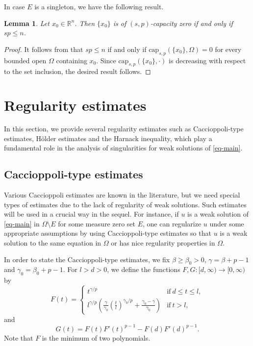 \documentclass[11pt]{amsart}
\theoremstyle{plain}
\newtheorem{lemma}[theorem]{Lemma}
\theoremstyle{definition}
\numberwithin{equation}{section}
\begin{document}
In case $E$ is a singleton, we have the following result.

\begin{lemma}\label{lem-cap-point}
	Let $x_0 \in \mathbb{R}^n$. Then $\{x_0\}$ is of $(s, p)$-capacity zero if and only if $sp \leq n$.
\end{lemma}

\begin{proof}
It follows from \cite[Lemma~5.5]{BBK24} that $sp\leq n$ if and only if $\mathrm{cap}_{s, p}(\{x_0\}, \Omega)=0$ for every bounded open $\Omega$ containing $x_0$. Since $\mathrm{cap}_{s, p}(\{x_0\}, \cdot)$ is decreasing with respect to the set inclusion, the desired result follows.
\end{proof}

\section{Regularity estimates}\label{sec-regularity}

In this section, we provide several regularity estimates such as Caccioppoli-type estimates, H\"older estimates and the Harnack inequality, which play a fundamental role in the analysis of singularities for weak solutions of \eqref{eq-main}.

\subsection{Caccioppoli-type estimates}

Various Caccioppoli estimates are known in the literature, but we need special types of estimates due to the lack of regularity of weak solutions. Such estimates will be used in a crucial way in the sequel. For instance, if $u$ is a weak solution of \eqref{eq-main} in $\Omega \setminus E$ for some measure zero set $E$, one can regularize $u$ under some appropriate assumptions by using Caccioppoli-type estimates so that $u$ is a weak solution to the same equation in $\Omega$ or has nice regularity properties in $\Omega$.

In order to state the Caccioppoli-type estimates, we fix $\beta \geq \beta_0>0$, $\gamma = \beta+p-1$ and $\gamma_0 = \beta_0+p-1$. For $l>d>0$, we define the functions $F, G: [d, \infty) \to [0, \infty)$ by
\begin{equation}\label{eq-F}
F(t)=
\begin{cases}
t^{\gamma/p} &\text{if}~d\leq t \leq l, \\
l^{\gamma/p} (\frac{\gamma}{\gamma_0}(\frac{t}{l})^{\gamma_0/p} + \frac{\gamma_0-\gamma}{\gamma_0}) &\text{if}~t> l,
\end{cases}
\end{equation}
and
\begin{equation*}
G(t)=F(t)F'(t)^{p-1} - F(d)F'(d)^{p-1}.
\end{equation*}
Note that $F$ is the minimum of two polynomials.
\end{document}
